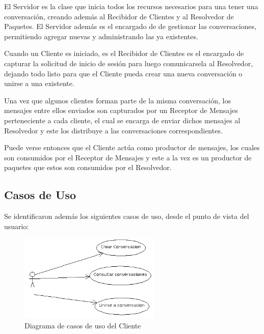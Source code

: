 \documentclass[a4paper,12pt,titlepage]{article}
\begin{document}
El Servidor es la clase que inicia todos los recursos necesarios para una tener una conversación, creando además
al Recibidor de Clientes y al Resolvedor de Paquetes. El Servidor además es el encargado de de gestionar las 
conversaciones, permitiendo agregar nuevas y administrando las ya existentes.

Cuando un Cliente es iniciado, es el Recibidor de Clientes es el encargado de capturar la solicitud de inicio de sesión para luego comunicarsela al Resolvedor, 
dejando todo listo para que el Cliente pueda crear una nueva conversación o unirse a una existente.

Una vez que algunos clientes forman parte de la misma conversación, los mensajes entre ellos enviados son capturados
por un Receptor de Mensajes perteneciente a cada cliente, el cual se encarga de enviar dichos mensajes al Resolvedor y este los distribuye a las conversaciones correspondientes.

Puede verse entonces que el Cliente actúa como productor de mensajes, los cuales son consumidos por el Receptor de Mensajes y este a la vez es un productor de paquetes que estos son consumidos por el Resolvedor.\\

\subsection{Casos de Uso}
Se identificaron además los siguientes casos de uso, desde el punto de vista del usuario:\\
\begin{figure}[h!]
\centering
\includegraphics[width=0.6\textwidth]{CasosDeUso.png}
\caption{Diagrama de casos de uso del Cliente}
\label{fig:casos_uso}
\end{figure}
\end{document}
